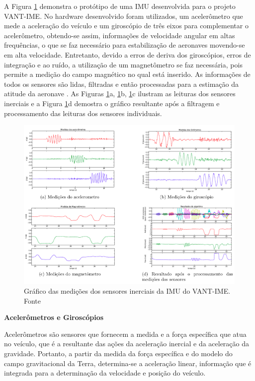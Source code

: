 \documentclass[a4paper, 12pt]{article}
\begin{document}
A Figura \ref{fig:imuVANTIME} demonstra o protótipo de uma IMU desenvolvida para o projeto VANT-IME. No hardware desenvolvido foram utilizados, um acelerômetro que mede a aceleração do veículo e um giroscópio de três eixos para complementar o acelerômetro, obtendo-se assim, informações de velocidade angular em altas frequências, o que se faz necessário para estabilização de aeronaves movendo-se em alta velocidade. Entretanto, devido a erros de deriva dos giroscópios, erros de integração e ao ruído, a utilização de um magnetômetro se faz necessária, pois permite a medição do campo magnético no qual está inserido. As informações de todos os sensores são lidas, filtradas e então processadas para a estimação da atitude da aeronave \cite{Paixao2011}. As Figuras \ref{fig:imuVANTIME}a,  \ref{fig:imuVANTIME}b,  \ref{fig:imuVANTIME}c ilustram as leituras dos sensores inerciais e a Figura \ref{fig:imuVANTIME}d demostra o gráfico resultante após a filtragem e processamento das leituras dos sensores individuais.

\begin{figure}[h]
	\centering
		\includegraphics[scale=0.5]{img/imu_VANTIME.png}
	\caption{Gráfico das medições dos sensores inerciais da IMU do VANT-IME. Fonte \cite{Paixao2011}}
	\label{fig:imuVANTIME}
\end{figure}

\noindent\textbf{Acelerômetros e Giroscópios}

Acelerômetros são sensores que fornecem a medida e a força específica que atua no veículo, que é a resultante das ações da aceleração inercial e da aceleração da gravidade. Portanto, a partir da medida da força específica e do modelo do campo gravitacional da Terra, determina-se a aceleração linear, informação que é integrada para a determinação da velocidade e posição do veículo.
\end{document}
